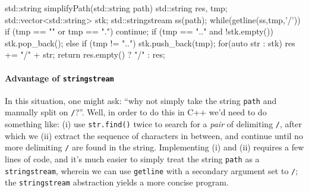 \documentclass[12pt,letterpaper,twoside]{article}
\begin{document}
\begin{cpp}
std::string simplifyPath(std::string path) {
  std::string res, tmp;     
  std::vector<std::string> stk;    
  std::stringstream ss(path);     
  while(getline(ss,tmp,'/')) {         
    if (tmp == "" or tmp == ".")      continue;         
    if (tmp == ".." and !stk.empty()) stk.pop_back();         
    else if (tmp != "..")             stk.push_back(tmp);    
  }     
  for(auto str : stk) res += "/" + str;     
  return res.empty() ? "/" : res; 
}
\end{cpp}

\paragraph{Advantage of \texttt{stringstream}} In this situation, one might ask:
``why not simply take the string \texttt{path} and manually split on \texttt{/}?''.
Well, in order to do this in C++ we'd need to do something like: (i)
use \texttt{str.find()} twice to search for a \emph{pair} of delimiting \texttt{/},
after which we (ii) extract the sequence of characters in between, and continue until
no more delimiting \texttt{/} are found in the string. Implementing (i) and (ii) 
requires a few lines of code, and it's much easier to simply treat the string 
\texttt{path} as a \texttt{stringstream}, wherein we can use \texttt{getline} with a 
secondary argument set to \texttt{/}; the \texttt{stringstream} 
abstraction yields a more concise program.



\end{document}
